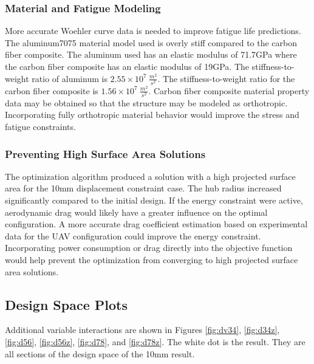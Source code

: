 \documentclass[doublespace,nopageskip]{VTthesis}
\begin{document}
{ \subsection{Material and Fatigue Modeling}

	More accurate Woehler curve data is needed to improve fatigue life predictions. The aluminum7075 material model used is overly stiff compared to the carbon fiber composite. The aluminum used has an elastic modulus of 71.7GPa where the carbon fiber composite has an elastic modulus of 19GPa. The stiffness-to-weight ratio of aluminum is $2.55 \times 10^{7}\ \frac{m^2}{s^2}$. The stiffness-to-weight ratio for the carbon fiber composite is $1.56 \times 10^{7}\ \frac{m^2}{s^2}$. Carbon fiber composite material property data may be obtained so that the structure may be modeled as orthotropic. Incorporating fully orthotropic material behavior would improve the stress and fatigue constraints.
	
\subsection{Preventing High Surface Area Solutions}
	
	The optimization algorithm produced a solution with a high projected surface area for the 10mm displacement constraint case. The hub radius increased significantly compared to the initial design. If the energy constraint were active, aerodynamic drag would likely have a greater influence on the optimal configuration. A more accurate drag coefficient estimation based on experimental data for the UAV configuration could improve the energy constraint. Incorporating power consumption or drag directly into the objective function would help prevent the optimization from converging to high projected surface area solutions.
	
	
	
	   
	
	\appendix
	
	\begin{appendices}
		\chapter{Design Space Plots} \label{app:appendix_one}
			Additional variable interactions are shown in Figures \ref{fig:dv34}, \ref{fig:d34z}, \ref{fig:d56}, \ref{fig:d56z}, \ref{fig:d78}, and \ref{fig:d78z}. The white dot is the result. They are all sections of the design space of the 10mm result. 
		

\end{appendices}}
\end{document}
